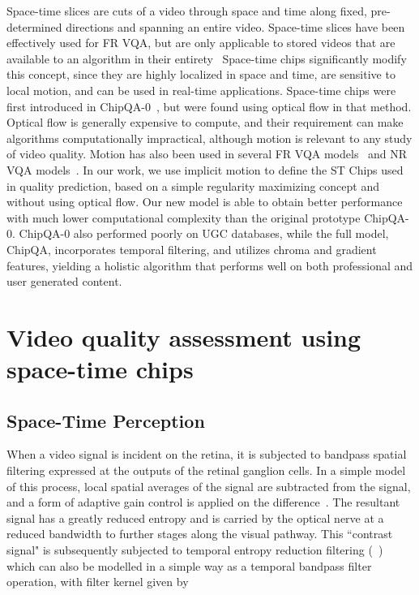 \documentclass[journal]{IEEEtran}
\begin{document}
Space-time slices are cuts of a video through space and time along fixed, pre-determined directions and spanning an entire video. Space-time slices have been effectively used for FR VQA, but are only applicable to stored videos that are available to an algorithm in their entirety~\cite{frsts,sts2,sts3,sts1}  Space-time chips significantly modify this concept, since they are highly localized in space and time, are sensitive to local motion, and can be used in real-time applications. Space-time chips were first introduced in ChipQA-0~\cite{chipqa0}, but were found using optical flow in that method. Optical flow is generally expensive to compute, and their requirement can make algorithms computationally impractical, although motion is relevant to any study of video quality. Motion has also been used in several FR VQA models~\cite{movie,motionstruct,frof} and NR VQA models~\cite{vbliinds,chipqa0,tlvqm,nrof}. In our work, we use implicit motion to define the ST Chips used in quality prediction, based on a simple regularity maximizing concept and without using optical flow. {Our new model is able to obtain better performance with much lower computational complexity than the original prototype ChipQA-0.} ChipQA-0 also performed poorly on UGC databases, while the full model, ChipQA, incorporates temporal filtering, and utilizes chroma and gradient features, yielding a holistic algorithm that performs well on both professional and  user generated content.

\section{Video quality assessment using space-time chips}

\subsection{Space-Time Perception}
When a video signal is incident on the retina, it is subjected to bandpass spatial filtering expressed at the outputs of the retinal ganglion cells. In a simple model of this process, local spatial averages of the signal are subtracted from the signal, and a form of adaptive gain control is applied on the difference~\cite{simoncelli}. The resultant signal has a greatly reduced entropy and is carried by the optical nerve at a reduced bandwidth to further stages along the visual pathway. This ``contrast signal" is subsequently subjected to temporal entropy reduction filtering (~\cite{simoncelliMT,lgn, adelson, ahumada}) which can also be modelled in a simple way as a temporal bandpass filter operation, with filter kernel given by
\end{document}
